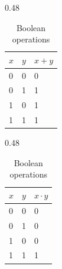 \documentclass{article}
\numberwithin{equation}{section}
\theoremstyle{definition}
\begin{document}
\begin{table}[H]
     \centering
     \begin{subtable}[t]{0.48\textwidth}
    \centering
    \begin{tabular}{|m{1cm}|m{1cm}|m{1cm}|}
    \hline
     $x$ & $y$ & $x+y$ \\
     \hline
     0 & 0 & 0\\
     0 & 1 & 1\\
     1 & 0 & 1\\
     1 & 1 & 1\\
    \hline
    \end{tabular}
    \caption{Boolean addition}
    \label{fig: boolean_addition}
     \end{subtable}
     \hfill
     \begin{subtable}[t]{0.48\textwidth}
    \centering
    \begin{tabular}{|m{1cm}|m{1cm}|m{1cm}|}
    \hline
     $x$ & $y$ & $x \cdot y$ \\
     \hline
     0 & 0 & 0\\
     0 & 1 & 0\\
     1 & 0 & 0\\
     1 & 1 & 1\\
    \hline
    \end{tabular}
    \caption{Boolean multiplication}
    \label{fig: boolean_multiplication}
     \end{subtable}
     \hfill
    \caption{Boolean operations}
    \label{fig: boolean_operations}
\end{table}
\end{document}
